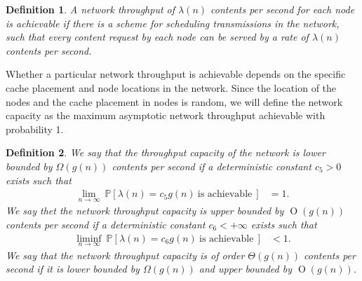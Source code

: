 \documentclass[10pt,journal]{IEEEtran}
\newtheorem{mydef}{Definition}
\begin{document}

\begin{mydef}{\em 
 A network throughput of $\lambda(n)$ contents per second for each node is {\em achievable} if there is a scheme for scheduling transmissions in the network, such that every content request by each node can be served by a rate of $\lambda(n)$ contents per second.
 }\label{def_achievable}
\end{mydef}

Whether a particular network throughput is achievable depends on the specific cache placement and node locations in the network. Since the location of the nodes and the cache placement in nodes is random, we will define the network capacity as the maximum asymptotic network throughput achievable with probability 1.

\begin{mydef}{\em 
 We say that the {\em throughput capacity} of the network is lower bounded by $\Omega(g(n))$ contents per second if a deterministic constant $c_5 > 0$ exists such that 
 \begin{align}
   \lim_{n \to \infty} ~\mathbb{P}[\lambda(n) = c_5 g(n) ~\textrm{is achievable}~] &= 1. 
 \label{lb_def_cap}
 \end{align}
 We say thet the network throughput capacity is upper bounded by $\operatorname{O}(g(n))$ contents per second if a deterministic constant  $c_6 < + \infty$ exists such that 
 \begin{align}
 \liminf_{n \to \infty} ~\mathbb{P}[\lambda(n) = c_6 g(n) ~\textrm{is achievable}~] &<1.
 \label{ub_def_cap}
 \end{align}
 We say that the network throughput capacity is of order $\Theta(g(n))$ contents per second if it is lower bounded by $\Omega(g(n))$ and upper bounded by $\operatorname{O}(g(n))$.
 }\label{def_cap}
\end{mydef}
\end{document}
